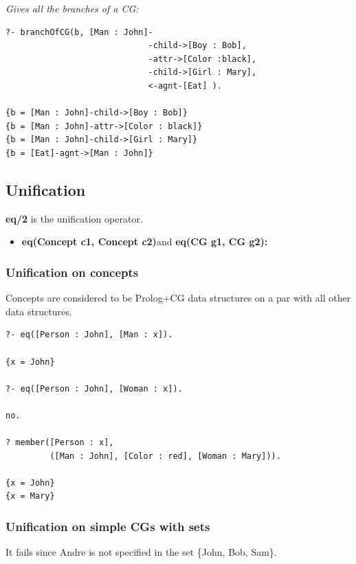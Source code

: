 \documentclass{book}
\begin{document}
{\it Gives all the branches of a CG:}

\begin{verbatim}
?- branchOfCG(b, [Man : John]-
                             -child->[Boy : Bob],
                             -attr->[Color :black],
                             -child->[Girl : Mary],
                             <-agnt-[Eat] ).

{b = [Man : John]-child->[Boy : Bob]}
{b = [Man : John]-attr->[Color : black]}
{b = [Man : John]-child->[Girl : Mary]}
{b = [Eat]-agnt->[Man : John]}
\end{verbatim}


\subsection{Unification}

{\bf eq/2} is the unification operator.

\begin{itemize}

  \item {\bf eq(Concept c1, Concept c2)}and
  {\bf eq(CG g1, CG g2):}

\end{itemize}


\subsubsection{Unification on concepts}

Concepts are considered to be Prolog+CG data structures on a par
with all other data structures.


\begin{verbatim}
?- eq([Person : John], [Man : x]).

{x = John}

?- eq([Person : John], [Woman : x]).

no.

? member([Person : x], 
         ([Man : John], [Color : red], [Woman : Mary])).

{x = John}
{x = Mary}
\end{verbatim}



\subsubsection{Unification on simple CGs with sets}

It fails since Andre is not specified in the set \{John, Bob, Sam\}.
\end{document}
